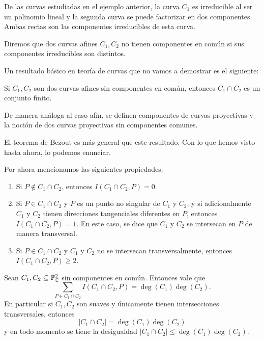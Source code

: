 \documentclass[12pt]{memoir}
\begin{document}
\begin{Ex}
  De las curvas estudiadas en el ejemplo anterior, la curva $C_1$ es irreducible al ser un polinomio lineal y la segunda curva se puede factorizar en dos componentes. Ambas rectas son las componentes irreducibles de esta curva.
\end{Ex}

\begin{Def}
  Diremos que dos curvas afines $C_1, C_2$ no tienen componentes en común si sus componentes irreducibles son distintos.
\end{Def}

Un resultado básico en teoría de curvas que no vamos a demostrar es el siguiente:

\begin{Prop}
  Si $C_1, C_2$ son dos curvas afines sin componentes en común, entonces $C_1\cap C_2$ es un conjunto finito.
\end{Prop}

\begin{Rmk}
  De manera análoga al caso afín, se definen componentes de curvas proyectivas y la noción de dos curvas proyectivas sin componentes comunes.
\end{Rmk}

El teorema de Bezout es más general que este resultado. Con lo que hemos visto hasta ahora, lo podemos enunciar.\par
Por ahora mencionamos las siguientes propiedades:
\begin{enumerate}
  \item Si $P\not\in C_1\cap C_2$, entonces $I(C_1\cap C_2,P)=0$.
  \item Si $P\in C_1\cap C_2$ y $P$ es un punto no singular de $C_1$ y $C_2$, y si adicionalmente $C_1$ y $C_2$ tienen direcciones tangenciales diferentes en $P$, entonces $I(C_1\cap C_2,P)=1$. En este caso, se dice que $C_1$ y $C_2$ se intersecan en $P$ de manera transversal.
  \item Si $P\in C_1\cap C_2$ y $C_1$ y $C_2$ no se intersecan transversalmente, entonces $I(C_1\cap C_2,P)\geq 2$.
\end{enumerate}

\begin{Th}[Bezout]
  Sean $C_1,C_2\subseteq\mathbb{P}_{\mathbb{C}}^2$ sin componentes en común. Entonces vale que
  $$\sum_{P\in C_1\cap C_2}I(C_1\cap C_2,P)=\deg(C_1)\deg(C_2).$$
  En particular si $C_1,C_2$ son suaves y únicamente tienen intersecciones transversales, entonces
  $$|C_1\cap C_2|=\deg(C_1)\deg(C_2)$$
  y en todo momento se tiene la desigualdad $|C_1\cap C_2|\leq\deg(C_1)\deg(C_2)$.
\end{Th}
\end{document}
